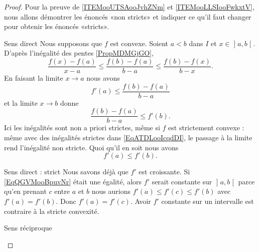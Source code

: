 \begin{proof}


    Pour la preuve de \ref{ITEMooUTSAooJvhZNm} et \ref{ITEMooLLSIooFwkxtV}, nous allons démontrer les énoncés «non stricts»  et indiquer ce qu'il faut changer pour obtenir les énoncés «stricts».
    \begin{subproof}
    \item[Sens direct]
    Nous supposons que \( f\) est convexe. Soient \( a<b\) dans \( I\) et \( x\in\mathopen] a , b \mathclose[\). D'après l'inégalité des pentes \ref{PropMDMGjGO},
        \begin{equation}        \label{EqATDLooIcqdDI}
            \frac{ f(x)-f(a) }{ x-a }\leq\frac{ f(b)-f(a) }{ b-a }\leq \frac{ f(b)-f(x) }{ b-x }.
        \end{equation}
        En faisant la limite \( x\to a\) nous avons
        \begin{equation}
            f'(a)\leq \frac{ f(b)-f(a) }{ b-a }
        \end{equation}
        et la limite \( x\to b\) donne
        \begin{equation}
            \frac{ f(b)-f(a) }{ b-a }\leq f'(b).
        \end{equation}
        Ici les inégalités sont non a priori strictes, même si \( f\) est strictement convexe : même avec des inégalités strictes dans \eqref{EqATDLooIcqdDI}, le passage à la limite rend l'inégalité non stricte. Quoi qu'il en soit nous avons 
        \begin{equation}        \label{EqQGVMooBpuvNr}
            f'(a)\leq f'(b).
        \end{equation}
    \item[Sens direct : strict]
         Nous savons déjà que \( f'\) est croissante. Si \eqref{EqQGVMooBpuvNr} était une égalité, alors \( f'\) serait constante sur \( \mathopen] a , b \mathclose[\) parce qu'en prenant \( c\) entre \( a\) et \( b\) nous aurions \( f'(a)\leq f'(c)\leq f'(b)\) avec \( f'(a)=f'(b)\). Donc \( f'(a)=f'(c)\). Avoir \( f'\) constante sur un intervalle est contraire à la stricte convexité.

         \item[Sens réciproque]


\end{subproof}
\end{proof}
